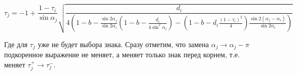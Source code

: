 \documentclass[a4paper]{article}
\begin{document}
\begin{equation} \label{GrindEQ__29_} \tau _{j} =-1+\frac{1-\tau _{i} }{\sin \alpha _{j} } \sqrt{\frac{d_{i} }{4\left(1-b-\frac{\sin 2\alpha _{j} }{\sin 2\alpha _{i} } \left(1-b-\frac{d_{i} }{4\sin ^{2} \alpha _{i} } \right)-\left(1-b-d_{i} \frac{\left(1-\tau _{i} \right)^{2} }{4} \right)\frac{\sin 2\left(\alpha _{j} -\alpha _{i} \right)}{\sin 2\alpha _{i} } \right)} }  \end{equation}

Где для $\tau _{j} $ уже не будет выбора знака. Сразу отметим, что замена $\alpha _{j} \to \alpha _{j} -\pi $ подкоренное выражение не меняет, а меняет только знак перед корнем, т.е. меняет $\tau _{j}^{+} \to \tau _{j}^{-} $.


\end{document}
